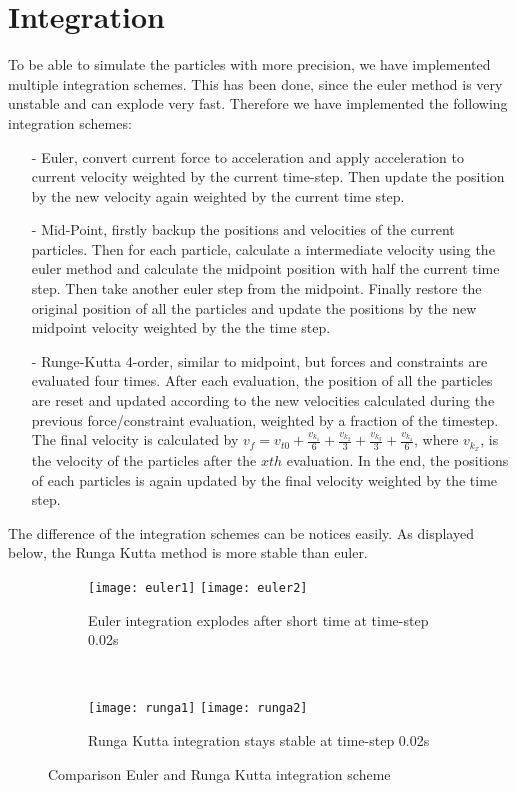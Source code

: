 \section{Integration}
To be able to simulate the particles with more precision, we have implemented multiple integration schemes. This has been done, since the euler method is very unstable and can explode very fast. Therefore we have implemented the following integration schemes:
\begin{itemize}
  \item[-] Euler, convert current force to acceleration and apply acceleration to current velocity weighted by the current time-step. Then update the position by the new velocity again weighted by the current time step.
  \item[-] Mid-Point, firstly backup the positions and velocities of the current particles. Then for each particle, calculate a intermediate velocity using the euler method and calculate the midpoint position with half the current time step. Then take another euler step from the midpoint. Finally restore the original position of all the particles and update the positions by the new midpoint velocity weighted by the the time step.
  \item[-] Runge-Kutta 4-order, similar to midpoint, but forces and constraints are evaluated four times. After each evaluation, the position of all the particles are reset and updated according to the new velocities calculated during the previous force/constraint evaluation, weighted by a fraction of the timestep. The final velocity is calculated by $v_f = v_{t0} + \frac{v_{k_1}}{6} + \frac{v_{k_2}}{3} + \frac{v_{k_3}}{3} + \frac{v_{k_4}}{6}$, where $v_{k_x}$, is the velocity of the particles after the $xth$ evaluation. In the end, the positions of each particles is again updated by the final velocity weighted by the time step.
\end{itemize}
The difference of the integration schemes can be notices easily. As displayed below, the Runga Kutta method is more stable than euler.

\begin{figure}[!htbp]
  \begin{subfigure}[h]{\textwidth}
  \centering
    \texttt{[image: euler1]}
    \texttt{[image: euler2]}
    \caption{Euler integration explodes after short time at time-step 0.02s}
    \label{fig:euler}
  \end{subfigure}
  \\
  \begin{subfigure}[h]{\textwidth}
  \centering
    \texttt{[image: runga1]}
    \texttt{[image: runga2]}
    \caption{Runga Kutta integration stays stable at time-step 0.02s}
    \label{fig:ruga}
  \end{subfigure}

  \caption{Comparison Euler and Runga Kutta integration scheme}
  \label{fig:integration}
\end{figure}

